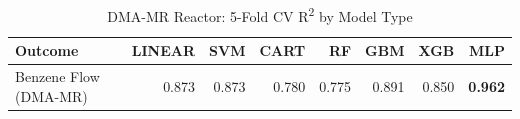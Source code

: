 \begin{table}[ht]
\centering
\caption{DMA-MR Reactor: 5-Fold CV R\textsuperscript{2} by Model Type}
\begin{tabular}{lrrrrrrr}
\toprule
Outcome & LINEAR & SVM & CART & RF & GBM & XGB & MLP \\
\midrule
Benzene Flow (DMA-MR) & 0.873 & 0.873 & 0.780 & 0.775 & 0.891 & 0.850 & \textbf{0.962} \\
\bottomrule
\end{tabular}
\end{table}